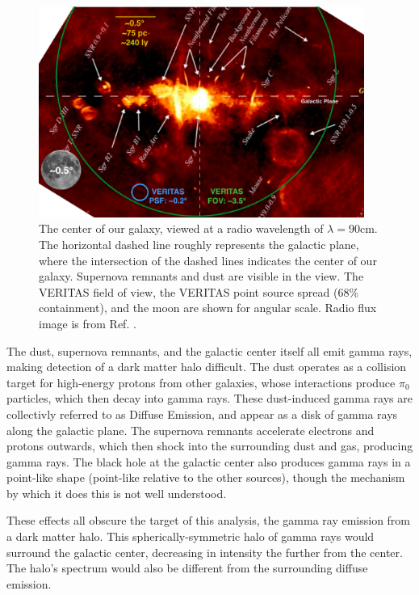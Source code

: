 \begin{figure}[ht]
  \centering
  \includegraphics[width=0.95\textwidth]{images/GalacticCenterInRadio.eps}
  \caption[Galactic Center in Radio]{
    The center of our galaxy, viewed at a radio wavelength of $\lambda=90\text{cm}$.
    The horizontal dashed line roughly represents the galactic plane, where the intersection of the dashed lines indicates the center of our galaxy.
    Supernova remnants and dust are visible in the view.
    The VERITAS field of view, the VERITAS point source spread (68\% containment), and the moon are shown for angular scale.
    Radio flux image is from Ref. \cite{galactic_center_in_radio}.}
  \label{fig_gc_radio}
\end{figure}

The dust, supernova remnants, and the galactic center itself all emit gamma rays, making detection of a dark matter halo difficult.
The dust operates as a collision target for high-energy protons from other galaxies, whose interactions produce $\pi_0$ particles, which then decay into gamma rays.
These dust-induced gamma rays are collectivly referred to as Diffuse Emission, and appear as a disk of gamma rays along the galactic plane.
The supernova remnants accelerate electrons and protons outwards, which then shock into the surrounding dust and gas, producing gamma rays.
The black hole at the galactic center also produces gamma rays in a point-like shape (point-like relative to the other sources), though the mechanism by which it does this is not well understood\cite{gal_cent_still_undetermined}.

These effects all obscure the target of this analysis, the gamma ray emission from a dark matter halo.
This spherically-symmetric halo of gamma rays would surround the galactic center, decreasing in intensity the further from the center.
The halo's spectrum would also be different from the surrounding diffuse emission.

